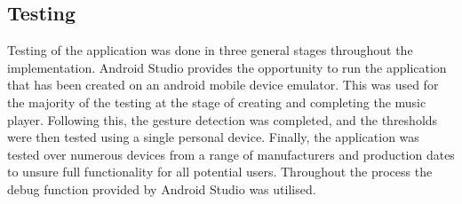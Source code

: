 \documentclass{l4proj}
\begin{document}


\subsection{Testing}

Testing of the application was done in three general stages throughout the implementation. Android Studio provides the opportunity to run the application that has been created on an android mobile device emulator. This was used for the majority of the testing at the stage of creating and completing the music player. Following this, the gesture detection was completed, and the thresholds were then tested using a single personal device. Finally, the application was tested over numerous devices from a range of manufacturers and production dates to unsure full functionality for all potential users. Throughout the process the debug function provided by Android Studio was utilised.
\end{document}
